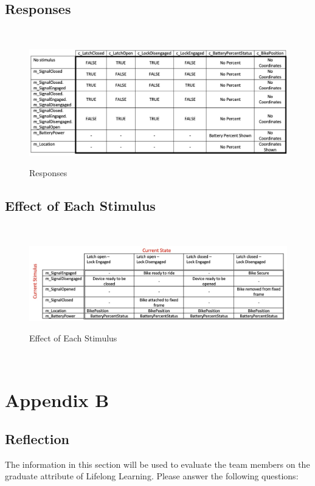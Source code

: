 \documentclass[12pt]{article}
\begin{document}
\subsection{Responses}
~\newline
\begin{figure}[h!]
 \begin{center}
 {
 \includegraphics[width=0.9\linewidth]{./Responses.jpeg}
 }
 \caption{\label{Responses} Responses}
 \end{center}
 \end{figure}
\subsection{Effect of Each Stimulus}
~\newline
\begin{figure}[h!]
 \begin{center}
 {
 \includegraphics[width=0.9\linewidth]{./EffectofEachStimulus.jpeg}
 }
 \caption{\label{Effect of Each Stimulus} Effect of Each Stimulus}
 \end{center}
 \end{figure}
~\newpage
\section{Appendix B}
\subsection{Reflection}

The information in this section will be used to evaluate the team members on the
graduate attribute of Lifelong Learning.  Please answer the following questions:
\end{document}
